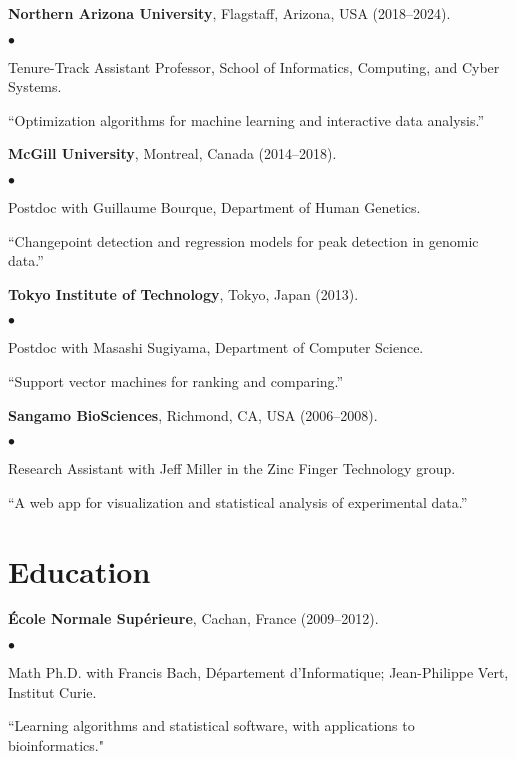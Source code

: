 \documentclass[margin,line]{res}
\newenvironment{list2}{
  \begin{list}{$\bullet$}{%
      \setlength{\itemsep}{0in}
      \setlength{\parsep}{0in} \setlength{\parskip}{0in}
      \setlength{\topsep}{0in} \setlength{\partopsep}{0in} 
      \setlength{\leftmargin}{0.2in}}}{\end{list}}
\begin{document}
\begin{resume}
{\bf Northern Arizona University}, Flagstaff, Arizona, USA (2018--2024).\\
\vspace*{-.1in}
\begin{list2}
\item[] Tenure-Track Assistant Professor, School of Informatics, Computing, and Cyber Systems.
\item[] ``Optimization algorithms for machine learning and interactive data analysis.''
\end{list2}

{\bf McGill University}, Montreal, Canada (2014--2018).\\
\vspace*{-.1in}
\begin{list2}
\item[] Postdoc with Guillaume Bourque, Department of Human Genetics.
\item[]``Changepoint detection and regression models for peak detection in genomic data.''
\end{list2}

{\bf Tokyo Institute of Technology}, Tokyo, Japan (2013).\\
\vspace*{-.1in}
\begin{list2}
\item[] Postdoc with Masashi Sugiyama, Department of Computer Science.
\item[] ``Support vector machines for ranking and comparing.''
\end{list2}

{\bf Sangamo BioSciences}, Richmond, CA, USA (2006--2008).\\
\vspace*{-.1in}
\begin{list2}
\item[] Research Assistant with Jeff Miller in the Zinc Finger Technology group.
\item[] ``A web app for visualization and statistical analysis of experimental data.''
\end{list2}

\section{\sc Education}

{\bf \'{E}cole Normale Sup\'{e}rieure}, Cachan, France (2009--2012).\\
\vspace*{-.1in}
\begin{list2}
\item[] Math Ph.D. with Francis Bach, D\'{e}partement d'Informatique; Jean-Philippe Vert, Institut Curie.
\item[] ``Learning algorithms and statistical software, with applications to bioinformatics."
\end{list2}


\end{resume}
\end{document}
